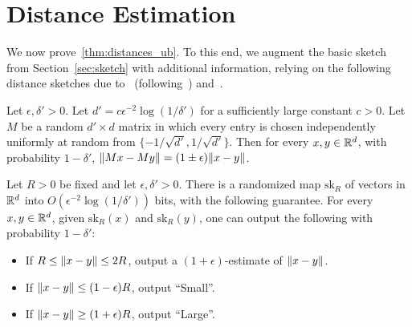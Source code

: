
\section{Distance Estimation}\label{sec:dist}
We now prove~\cref{thm:distances_ub}.
To this end, we augment the basic sketch from Section~\ref{sec:sketch} with additional information, relying on the following distance sketches due to~\cite{achlioptas2001database} (following~\cite{johnson1984extensions}) and~\cite{kushilevitz2000efficient}.

\begin{lemma}\label{lmm:binaryjl}
Let $\epsilon,\delta'>0$.
Let $d'=c\epsilon^{-2}\log(1/\delta')$ for a sufficiently large constant $c>0$.
Let $M$ be a random $d'\times d$ matrix in which every entry is chosen independently uniformly at random from $\{-1/\sqrt{d'},1/\sqrt{d'}\}$.
Then for every $x,y\in\mathbb R^d$, with probability $1-\delta'$, $\lVert Mx-My\rVert=(1\pm\epsilon)\lVert x-y\rVert$.
\end{lemma}

\begin{lemma}\label{lmm:kor}
Let $R>0$ be fixed and let $\epsilon,\delta'>0$. There is a randomized map $\mathrm{sk}_R$ of vectors in $\mathbb R^d$ into $O(\epsilon^{-2}\log(1/\delta'))$ bits, with the following guarantee.
For every $x,y\in\mathbb R^d$, given $\mathrm{sk}_R(x)$ and $\mathrm{sk}_R(y)$, one can output the following with probability $1-\delta'$:
\begin{itemize}
  \item If $R\leq\lVert x-y\rVert\leq 2R$, output a $(1+\epsilon)$-estimate of $\lVert x-y\rVert$.
  \item If $\lVert x-y\rVert\leq (1-\epsilon)R$, output ``Small''.
  \item If $\lVert x-y\rVert\geq (1+\epsilon)R$, output ``Large''.  
\end{itemize} 
\end{lemma}

%


